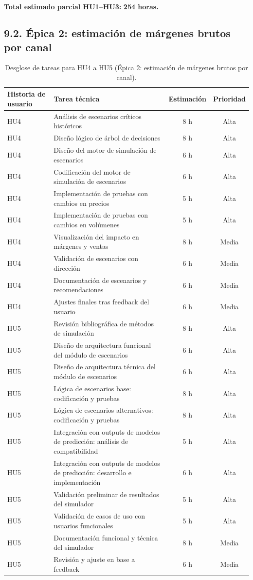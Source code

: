 \documentclass[
11pt, %
]{charter}
\begin{document}
\vspace{0.2cm}
\noindent
\textbf{Total estimado parcial HU1–HU3:} \textbf{254 horas.}

\subsection*{9.2. Épica 2: estimación de márgenes brutos por canal}

\begin{table}[H]
\centering
\begin{tabular}{|l|p{6cm}|c|c|}
\hline
\textbf{Historia de usuario} & \textbf{Tarea técnica} & \textbf{Estimación} & \textbf{Prioridad} \\
\hline
HU4 & Análisis de escenarios críticos históricos & 8 h & Alta \\
HU4 & Diseño lógico de árbol de decisiones & 8 h & Alta \\
HU4 & Diseño del motor de simulación de escenarios & 6 h & Alta \\
HU4 & Codificación del motor de simulación de escenarios & 6 h & Alta \\
HU4 & Implementación de pruebas con cambios en precios & 5 h & Alta \\
HU4 & Implementación de pruebas con cambios en volúmenes & 5 h & Alta \\
HU4 & Visualización del impacto en márgenes y ventas & 8 h & Media \\
HU4 & Validación de escenarios con dirección & 6 h & Media \\
HU4 & Documentación de escenarios y recomendaciones & 6 h & Media \\
HU4 & Ajustes finales tras feedback del usuario & 6 h & Media \\
\hline
HU5 & Revisión bibliográfica de métodos de simulación & 8 h & Alta \\
HU5 & Diseño de arquitectura funcional del módulo de escenarios & 6 h & Alta \\
HU5 & Diseño de arquitectura técnica del módulo de escenarios & 6 h & Alta \\
HU5 & Lógica de escenarios base: codificación y pruebas & 8 h & Alta \\
HU5 & Lógica de escenarios alternativos: codificación y pruebas & 8 h & Alta \\
HU5 & Integración con outputs de modelos de predicción: análisis de compatibilidad & 5 h & Alta \\
HU5 & Integración con outputs de modelos de predicción: desarrollo e implementación & 6 h & Alta \\
HU5 & Validación preliminar de resultados del simulador & 5 h & Alta \\
HU5 & Validación de casos de uso con usuarios funcionales & 5 h & Alta \\
HU5 & Documentación funcional y técnica del simulador & 8 h & Media \\
HU5 & Revisión y ajuste en base a feedback & 6 h & Media \\
\hline
\end{tabular}
\caption{Desglose de tareas para HU4 a HU5 (Épica 2: estimación de márgenes brutos por canal).}
\end{table}
\end{document}
